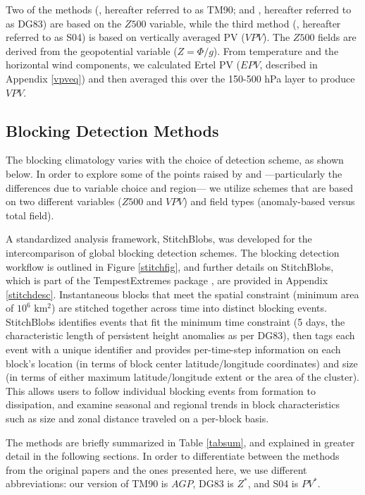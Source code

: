 \documentclass[smallextended]{svjour3}       %
\numberwithin{equation}{section}
\begin{document}
Two of the methods (\cite{tibaldi_operational_1990}, hereafter referred to as TM90; and \cite{dole_persistent_1983}, hereafter referred to as DG83) are based on the $Z500$ variable, while the third method (\cite{schwierz_perspicacious_2004}, hereafter referred to as S04) is based on vertically averaged PV ($VPV$). The $Z500$ fields are derived from the geopotential variable ($Z = \Phi / g$). From temperature and the horizontal wind components, we calculated Ertel PV ($EPV$, described in Appendix \ref{vpveq}) and then averaged this over the 150-500 hPa layer to produce $VPV$.  

\subsection{Blocking Detection Methods}\label{detectionmethods}


The blocking climatology varies with the choice of detection scheme, as shown below. In order to explore some of the points raised by \cite{davini_bidimensional_2012} and \cite{scherrer_two-dimensional_2006}---particularly the differences due to variable choice and region--- we utilize schemes that are based on two different variables ($Z500$ and $VPV$) and field types (anomaly-based versus total field). 

A standardized analysis framework, StitchBlobs, was developed for the intercomparison of global blocking detection schemes. The blocking detection workflow is outlined in Figure \ref{stitchfig}, and further details on StitchBlobs, which is part of the TempestExtremes package \citep{ullrich_tempestextremes:_2017}, are provided in Appendix \ref{stitchdesc}. Instantaneous blocks that meet the spatial constraint (minimum area of $10^6$ km$^2$) are stitched together across time into distinct blocking events. StitchBlobs identifies events that fit the minimum time constraint (5 days, the characteristic length of persistent height anomalies as per DG83), then tags each event with a unique identifier and provides per-time-step information on each block's location (in terms of block center latitude/longitude coordinates) and size (in terms of either maximum latitude/longitude extent or the area of the cluster). This allows users to follow individual blocking events from formation to dissipation, and examine seasonal and regional trends in block characteristics such as size and zonal distance traveled on a per-block basis. 

The methods are briefly summarized in Table \ref{tabsum}, and explained in greater detail in the following sections. In order to differentiate between the methods from the original papers and the ones presented here, we use different abbreviations: our version of TM90 is $AGP$, DG83 is $Z^*$, and S04 is $PV^*$. 
\end{document}
